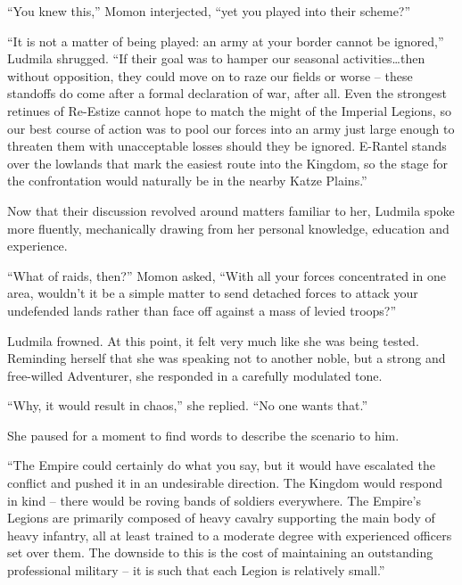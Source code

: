  

“You knew this,” Momon interjected, “yet you played into their scheme?”

 

“It is not a matter of being played: an army at your border cannot be ignored,” Ludmila shrugged. “If their goal was to hamper our seasonal activities…then without opposition, they could move on to raze our fields or worse – these standoffs do come after a formal declaration of war, after all. Even the strongest retinues of Re-Estize cannot hope to match the might of the Imperial Legions, so our best course of action was to pool our forces into an army just large enough to threaten them with unacceptable losses should they be ignored. E-Rantel stands over the lowlands that mark the easiest route into the Kingdom, so the stage for the confrontation would naturally be in the nearby Katze Plains.”

 

Now that their discussion revolved around matters familiar to her, Ludmila spoke more fluently, mechanically drawing from her personal knowledge, education and experience.

 

“What of raids, then?” Momon asked, “With all your forces concentrated in one area, wouldn’t it be a simple matter to send detached forces to attack your undefended lands rather than face off against a mass of levied troops?”

 

Ludmila frowned. At this point, it felt very much like she was being tested. Reminding herself that she was speaking not to another noble, but a strong and free-willed Adventurer, she responded in a carefully modulated tone.

 

“Why, it would result in chaos,” she replied. “No one wants that.”

 

She paused for a moment to find words to describe the scenario to him.

 

“The Empire could certainly do what you say, but it would have escalated the conflict and pushed it in an undesirable direction. The Kingdom would respond in kind – there would be roving bands of soldiers everywhere. The Empire’s Legions are primarily composed of heavy cavalry supporting the main body of heavy infantry, all at least trained to a moderate degree with experienced officers set over them. The downside to this is the cost of maintaining an outstanding professional military – it is such that each Legion is relatively small.”

